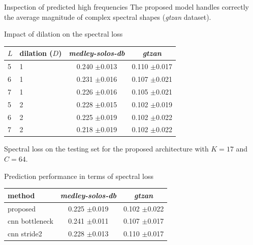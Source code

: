 \documentclass[compress]{beamer}
\begin{document}
\begin{frame}{Inspection of predicted high frequencies}
{    The proposed model handles correctly the average magnitude of complex spectral shapes (\textit{gtzan} dataset).
    }
\end{frame}

\begin{frame}{Impact of dilation on the spectral loss}
  \begin{center}
\begin{tabular}{llcc}
$L$ & dilation ($D$) & \textit{medley-solos-db} & \textit{gtzan} \\
\hline
5 & 1 & 0.240 $\pm$0.013 & 0.110 $\pm$0.017 \\
6 & 1 & 0.231 $\pm$0.016 & 0.107 $\pm$0.021 \\
7 & 1 & 0.226 $\pm$0.016 & 0.105 $\pm$0.021 \\
5 & 2 & 0.228 $\pm$0.015 & 0.102 $\pm$0.019 \\
6 & 2 & 0.225 $\pm$0.019 & 0.102 $\pm$0.022 \\
7 & 2 & 0.218 $\pm$0.019 & 0.102 $\pm$0.022 \\
\end{tabular}

Spectral loss on the testing set for the proposed architecture with $K=17$ and $C=64$.
  \end{center}
\end{frame}

\begin{frame}{Prediction performance in terms of spectral loss}
  \begin{center}
\begin{tabular}{lcc}
method & \textit{medley-solos-db} & \textit{gtzan} \\
\hline
proposed & 0.225 $\pm$0.019 & 0.102 $\pm$0.022 \\
cnn bottleneck & 0.241 $\pm$0.011 & 0.107 $\pm$0.017 \\
cnn stride2 & 0.228 $\pm$0.013 & 0.110 $\pm$0.017 \\
\end{tabular}
\end{center}
\end{frame}
\end{document}
